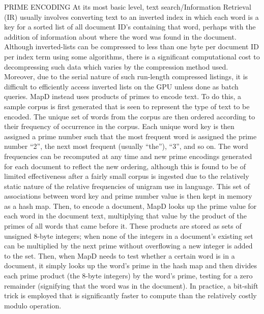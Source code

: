 \documentclass[twocolumn]{article}
\begin{document}
PRIME ENCODING
At its most basic level, text search/Information Retrieval (IR) usually involves converting text to an inverted index in which each word is a key for a sorted list of all document ID’s containing that word, perhaps with the addition of information about where the word was found in the document. Although inverted-lists can be compressed to less than one byte per document ID per index term using some algorithms, there is a significant computational cost to decompressing such data which varies by the compression method used. Moreover, due to the serial nature of such run-length compressed listings, it is difficult to efficiently access inverted lists on the GPU unless done as batch queries.
MapD instead uses products of primes to encode text. To do this, a sample corpus is first generated that is seen to represent the type of text to be encoded. The unique set of words from the corpus are then ordered according to their frequency of occurrence in the corpus. Each unique word key is then assigned a prime number such that the most frequent word is assigned the prime number “2”, the next most frequent (usually “the”), “3”, and so on. The word frequencies can be recomputed at any time and new prime encodings generated for each document to reflect the new ordering, although this is found to be of limited effectiveness after a fairly small corpus is ingested due to the relatively static nature of the relative frequencies of unigram use in language. This set of associations between word key and prime number value is then kept in memory as a hash map. Then, to encode a document, MapD looks up the prime value for each word in the document text, multiplying that value by the product of the primes of all words that came before it. These products are stored as sets of unsigned 8-byte integers; when none of the integers in a document’s existing set can be multiplied by the next prime without overflowing a new integer is added to the set. Then, when MapD needs to test whether a certain word is in a document, it simply looks up the word’s prime in the hash map and then divides each prime product (the 8-byte integers) by the word’s prime, testing for a zero
remainder (signifying that the word was in the document). In practice, a bit-shift trick is employed that is significantly faster to compute than the relatively costly modulo operation.
\end{document}
